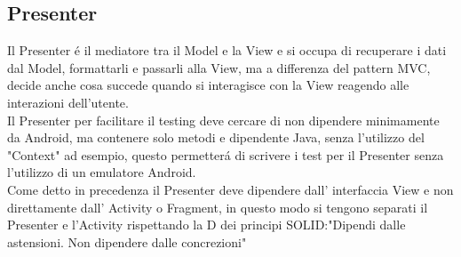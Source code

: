 \subsection{Presenter}
Il Presenter \'e il mediatore tra il Model e la View e si occupa di  recuperare i dati dal Model, formattarli e passarli alla View, ma a differenza del pattern MVC, decide anche cosa succede quando si interagisce con la View reagendo alle interazioni dell'utente.\\
Il Presenter per facilitare il testing deve cercare di non dipendere minimamente da Android, ma contenere solo metodi e dipendente Java, senza l'utilizzo del "Context" ad esempio, questo permetter\'a di scrivere i test per il Presenter senza l'utilizzo di un emulatore Android.\\
Come detto in precedenza  il Presenter deve dipendere dall' interfaccia View e non direttamente dall' Activity o Fragment, in questo modo si tengono separati il Presenter e l'Activity rispettando la D dei principi SOLID:"Dipendi dalle astensioni. Non dipendere dalle concrezioni"\\





\clearpage{\pagestyle{empty}\cleardoublepage}
